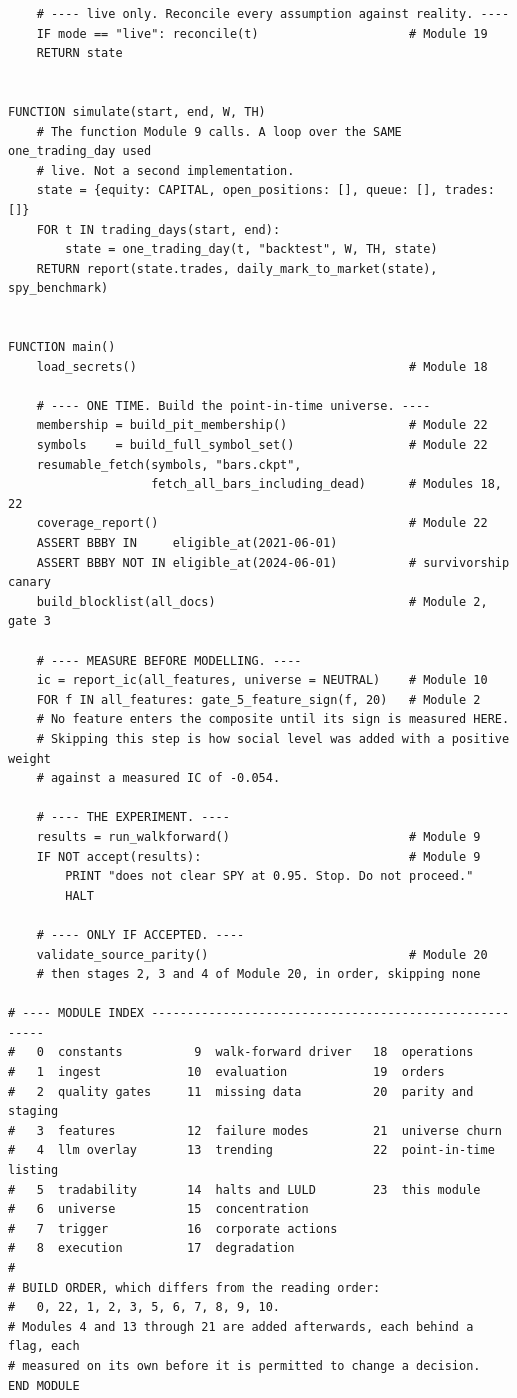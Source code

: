 \documentclass[10pt]{article}
\begin{document}
\begin{lstlisting}
    # ---- live only. Reconcile every assumption against reality. ----
    IF mode == "live": reconcile(t)                     # Module 19
    RETURN state


FUNCTION simulate(start, end, W, TH)
    # The function Module 9 calls. A loop over the SAME one_trading_day used
    # live. Not a second implementation.
    state = {equity: CAPITAL, open_positions: [], queue: [], trades: []}
    FOR t IN trading_days(start, end):
        state = one_trading_day(t, "backtest", W, TH, state)
    RETURN report(state.trades, daily_mark_to_market(state), spy_benchmark)


FUNCTION main()
    load_secrets()                                      # Module 18

    # ---- ONE TIME. Build the point-in-time universe. ----
    membership = build_pit_membership()                 # Module 22
    symbols    = build_full_symbol_set()                # Module 22
    resumable_fetch(symbols, "bars.ckpt",
                    fetch_all_bars_including_dead)      # Modules 18, 22
    coverage_report()                                   # Module 22
    ASSERT BBBY IN     eligible_at(2021-06-01)
    ASSERT BBBY NOT IN eligible_at(2024-06-01)          # survivorship canary
    build_blocklist(all_docs)                           # Module 2, gate 3

    # ---- MEASURE BEFORE MODELLING. ----
    ic = report_ic(all_features, universe = NEUTRAL)    # Module 10
    FOR f IN all_features: gate_5_feature_sign(f, 20)   # Module 2
    # No feature enters the composite until its sign is measured HERE.
    # Skipping this step is how social level was added with a positive weight
    # against a measured IC of -0.054.

    # ---- THE EXPERIMENT. ----
    results = run_walkforward()                         # Module 9
    IF NOT accept(results):                             # Module 9
        PRINT "does not clear SPY at 0.95. Stop. Do not proceed."
        HALT

    # ---- ONLY IF ACCEPTED. ----
    validate_source_parity()                            # Module 20
    # then stages 2, 3 and 4 of Module 20, in order, skipping none

# ---- MODULE INDEX -------------------------------------------------------
#   0  constants          9  walk-forward driver   18  operations
#   1  ingest            10  evaluation            19  orders
#   2  quality gates     11  missing data          20  parity and staging
#   3  features          12  failure modes         21  universe churn
#   4  llm overlay       13  trending              22  point-in-time listing
#   5  tradability       14  halts and LULD        23  this module
#   6  universe          15  concentration
#   7  trigger           16  corporate actions
#   8  execution         17  degradation
#
# BUILD ORDER, which differs from the reading order:
#   0, 22, 1, 2, 3, 5, 6, 7, 8, 9, 10.
# Modules 4 and 13 through 21 are added afterwards, each behind a flag, each
# measured on its own before it is permitted to change a decision.
END MODULE
\end{lstlisting}
\end{document}
